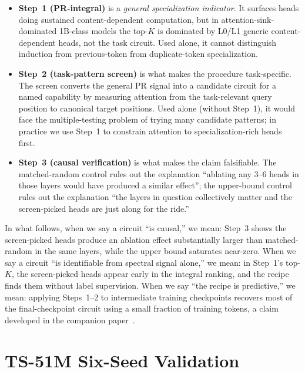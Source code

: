 \documentclass[11pt]{article}
\begin{document}
\begin{itemize}[leftmargin=*,topsep=2pt,itemsep=2pt]
\item \textbf{Step~1 (PR-integral)} is a \emph{general specialization indicator}. It surfaces heads doing sustained content-dependent computation, but in attention-sink-dominated 1B-class models the top-$K$ is dominated by L0/L1 generic content-dependent heads, not the task circuit. Used alone, it cannot distinguish induction from previous-token from duplicate-token specialization.

\item \textbf{Step~2 (task-pattern screen)} is what makes the procedure task-specific. The screen converts the general PR signal into a candidate circuit for a named capability by measuring attention from the task-relevant query position to canonical target positions. Used alone (without Step~1), it would face the multiple-testing problem of trying many candidate patterns; in practice we use Step~1 to constrain attention to specialization-rich heads first.

\item \textbf{Step~3 (causal verification)} is what makes the claim falsifiable. The matched-random control rules out the explanation ``ablating any 3--6 heads in those layers would have produced a similar effect''; the upper-bound control rules out the explanation ``the layers in question collectively matter and the screen-picked heads are just along for the ride.''
\end{itemize}

In what follows, when we say a circuit ``is causal,'' we mean: Step~3 shows the screen-picked heads produce an ablation effect substantially larger than matched-random in the same layers, while the upper bound saturates near-zero. When we say a circuit ``is identifiable from spectral signal alone,'' we mean: in Step~1's top-$K$, the screen-picked heads appear early in the integral ranking, and the recipe finds them without label supervision. When we say ``the recipe is predictive,'' we mean: applying Steps~1--2 to intermediate training checkpoints recovers most of the final-checkpoint circuit using a small fraction of training tokens, a claim developed in the companion paper~\citep{paper2_developmental}.

\section{TS-51M Six-Seed Validation}
\label{sec:ts51m}
\end{document}
